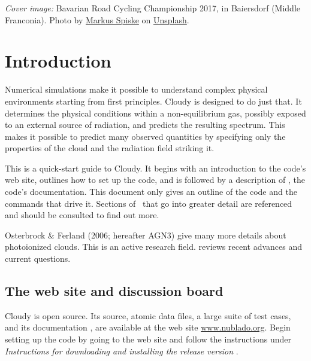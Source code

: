 \documentclass[12pt,twoside]{article}
\begin{document}
\clearpage

\vspace{5mm}
\noindent
{\small
{\em Cover image:} Bavarian Road Cycling Championship 2017,
  in Baiersdorf (Middle Franconia).
  Photo by
  \href{https://unsplash.com/@markusspiske?utm_source=unsplash&utm_medium=referral&utm_content=creditCopyText}
  {Markus Spiske} on
  \href{https://unsplash.com/license?utm_source=unsplash&utm_medium=referral&utm_content=creditCopyText}
  {Unsplash}.
\clearpage

\setcounter{tocdepth}{2}
\tableofcontents

\clearpage

\section{Introduction}
\label{sec:Introduction}

Numerical simulations make it
possible to understand complex physical
environments starting from first principles.  Cloudy is designed to do just
that.  It determines the physical conditions within a non-equilibrium gas,
possibly exposed to an external source of radiation, and predicts the
resulting spectrum.  This makes it possible to predict many observed
quantities by specifying only the properties of the cloud and the radiation
field striking it.

This is a quick-start guide to Cloudy.  It begins with an introduction
to the code's web site, outlines how to set up the code, and is followed
by a description of \Hazy, the code's documentation.  This document only
gives an outline of the code and the commands that drive it.  Sections of
\Hazy\ that go into greater detail are referenced and should be consulted
to find out more.

Osterbrock \& Ferland (2006; hereafter AGN3) give many more details
about photoionized clouds.
This is an active research field.
\citet{Ferland03} reviews recent advances and
current questions.

\subsection{The web site and discussion board}

Cloudy is open source.  Its source, atomic data files, a large suite
of test cases, and its documentation \Hazy, are available at the web site
\href{http://www.nublado.org}{www.nublado.org}.
Begin setting up the code by going to the
web site and
follow the instructions under
\emph{Instructions for downloading and installing the release version }.

}
\end{document}
